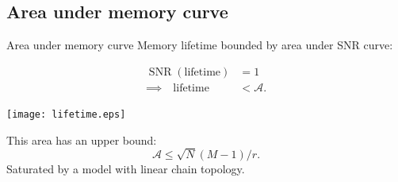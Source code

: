 \documentclass{beamer}%
\DeclareMathOperator{\SNR}{SNR}
\newcommand{\area}{\mathcal{A}}
\begin{document}

\subsection{Area under memory curve}


\begin{frame}{Area under memory curve}
%
  Memory lifetime bounded by area under SNR curve:\\
  \vp\parbox{5cm}{
  \begin{equation*}
  \begin{aligned}
    \SNR(\text{lifetime})&=1
    \\
    \implies
    \quad
    \text{lifetime} &< \area.
  \end{aligned}
  \end{equation*}
  }
  \parbox{6.5cm}{
    \texttt{[image: lifetime.eps]}
  }

  \vp This area has an upper bound:
  \begin{equation*}
    \area \leq \sqrt{N}(M-1)/r.
  \end{equation*}
  Saturated by a model with linear chain topology.
%
\end{frame}

\end{document}

